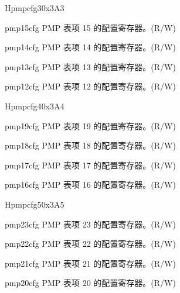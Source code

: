 \begin{register}{H}{pmpcfg3}{0x3A3}
\label{regdesc:pmpcfg3}%
%
%
%
%
\regnewline%
\begin{regdesc}
\begin{reglist}
\label{fielddesc:pmp15cfg}\item [pmp15cfg] PMP 表项 15 的配置寄存器。(R/W)
\label{fielddesc:pmp14cfg}\item [pmp14cfg] PMP 表项 14 的配置寄存器。(R/W)
\label{fielddesc:pmp13cfg}\item [pmp13cfg] PMP 表项 13 的配置寄存器。(R/W)
\label{fielddesc:pmp12cfg}\item [pmp12cfg] PMP 表项 12 的配置寄存器。(R/W)
\end{reglist}
\end{regdesc}
\end{register}

\begin{register}{H}{pmpcfg4}{0x3A4}
\label{regdesc:pmpcfg4}%
%
%
%
%
\regnewline%
\begin{regdesc}
\begin{reglist}
\label{fielddesc:pmp19cfg}\item [pmp19cfg] PMP 表项 19 的配置寄存器。(R/W)
\label{fielddesc:pmp18cfg}\item [pmp18cfg] PMP 表项 18 的配置寄存器。(R/W)
\label{fielddesc:pmp17cfg}\item [pmp17cfg] PMP 表项 17 的配置寄存器。(R/W)
\label{fielddesc:pmp16cfg}\item [pmp16cfg] PMP 表项 16 的配置寄存器。(R/W)
\end{reglist}
\end{regdesc}
\end{register}

\begin{register}{H}{pmpcfg5}{0x3A5}
\label{regdesc:pmpcfg5}%
%
%
%
%
\regnewline%
\begin{regdesc}
\begin{reglist}
\label{fielddesc:pmp23cfg}\item [pmp23cfg] PMP 表项 23 的配置寄存器。(R/W)
\label{fielddesc:pmp22cfg}\item [pmp22cfg] PMP 表项 22 的配置寄存器。(R/W)
\label{fielddesc:pmp21cfg}\item [pmp21cfg] PMP 表项 21 的配置寄存器。(R/W)
\label{fielddesc:pmp20cfg}\item [pmp20cfg] PMP 表项 20 的配置寄存器。(R/W)
\end{reglist}
\end{regdesc}
\end{register}

